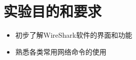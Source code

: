 

\section{实验目的和要求}

\begin{itemize}
    \item 初步了解WireShark软件的界面和功能
    \item 熟悉各类常用网络命令的使用
\end{itemize}

